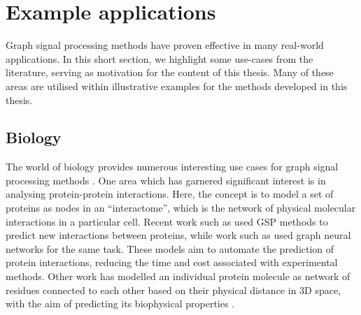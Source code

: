 



\newpage

\section{Example applications}

Graph signal processing methods have proven effective in many real-world applications. In this short section, we highlight some use-cases from the literature, serving as motivation for the content of this thesis. Many of these areas are utilised within illustrative examples for the methods developed in this thesis. 

\subsection{Biology}

The world of biology provides numerous interesting use cases for graph signal processing methods \citep{Li2023}. One area which has garnered significant interest is in analysing protein-protein interactions. Here, the concept is to model a set of proteins as nodes in an ``interactome'', which is the network of physical molecular interactions in a particular cell. Recent work such as \cite{Colonnese2021} used GSP methods to predict new interactions between proteins, while work such as \cite{Jha2022} used graph neural networks for the same task. These models aim to automate the prediction of protein interactions, reducing the time and cost associated with experimental methods. Other work has modelled an individual protein molecule as network of residues connected to each other based on their physical distance in 3D space, with the aim of predicting its biophysical properties \citep{Srivastava2023}. 

